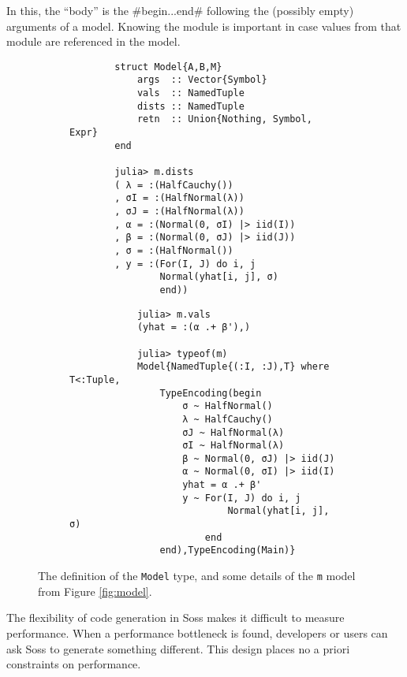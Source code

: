 \documentclass[anonymous=false, %
               format=acmsmall, %
               review=true, %
               screen=true, %
               nonacm=true]{acmart}
\begin{document}
In this, the ``body'' is the \jl#begin...end# following the (possibly empty) arguments of a model. Knowing the module is important in case values from that module are referenced in the model.


\begin{figure}[t]
    \begin{subfigure}[b]{0.48\textwidth}
        \begin{verbatim}
        struct Model{A,B,M} 
            args  :: Vector{Symbol}
            vals  :: NamedTuple
            dists :: NamedTuple
            retn  :: Union{Nothing, Symbol, Expr}
        end

        julia> m.dists
        ( λ = :(HalfCauchy())
        , σI = :(HalfNormal(λ))
        , σJ = :(HalfNormal(λ))
        , α = :(Normal(0, σI) |> iid(I))
        , β = :(Normal(0, σJ) |> iid(J))
        , σ = :(HalfNormal())
        , y = :(For(I, J) do i, j
                Normal(yhat[i, j], σ)
                end))
        \end{verbatim}

    \end{subfigure}    
    \begin{subfigure}[b]{0.48\textwidth}
        \begin{verbatim}
            julia> m.vals
            (yhat = :(α .+ β'),)

            julia> typeof(m)
            Model{NamedTuple{(:I, :J),T} where T<:Tuple,
                TypeEncoding(begin
                    σ ~ HalfNormal()
                    λ ~ HalfCauchy()
                    σJ ~ HalfNormal(λ)
                    σI ~ HalfNormal(λ)
                    β ~ Normal(0, σJ) |> iid(J)
                    α ~ Normal(0, σI) |> iid(I)
                    yhat = α .+ β'
                    y ~ For(I, J) do i, j
                            Normal(yhat[i, j], σ)
                        end
                end),TypeEncoding(Main)}
        \end{verbatim}
    \end{subfigure}    
    \caption{The definition of the \texttt{Model} type, and some details of the \texttt{m} model from Figure \ref{fig:model}.}
\end{figure}

The flexibility of code generation in Soss makes it difficult to measure performance. When a performance bottleneck is found, developers or users can ask Soss to generate something different. This design places no a priori constraints on performance.
\end{document}
